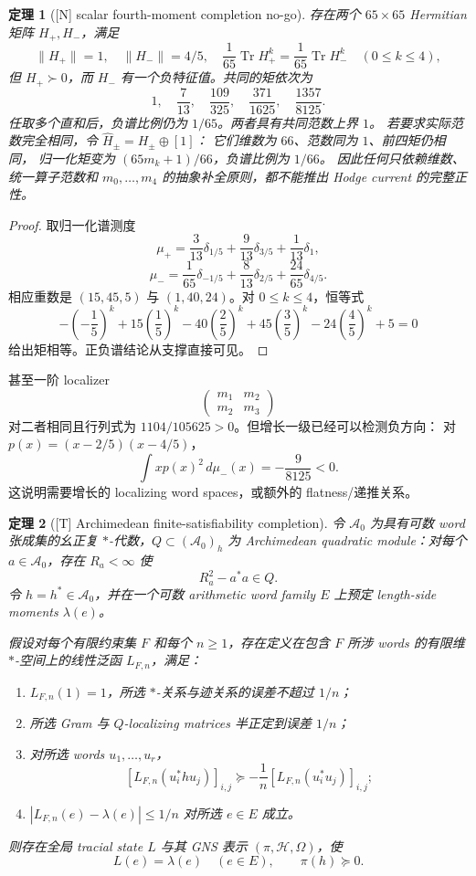 \documentclass[UTF8,11pt,a4paper]{ctexart}
\newtheorem{theorem}{定理}[section]
\theoremstyle{definition}
\theoremstyle{remark}
\newcommand{\Tr}{\operatorname{Tr}}
\newcommand{\1}{\mathbf 1}
\newcommand{\cH}{\mathcal H}
\newcommand{\cA}{\mathcal A}
\newcommand{\statusT}{\textnormal{[T]}}
\newcommand{\statusN}{\textnormal{[N]}}
\begin{document}
\begin{theorem}[\statusN{} scalar fourth-moment completion no-go]
\label{thm:four-moment-nogo}
存在两个 $65\times65$ Hermitian 矩阵 $H_+,H_-$，满足
\[
 \|H_+\|=1,\quad\|H_-\|=4/5,\quad
 \frac1{65}\Tr H_+^k=\frac1{65}\Tr H_-^k
 \quad(0\le k\le4),
\]
但 $H_+\succ0$，而 $H_-$ 有一个负特征值。共同的矩依次为
\[
 1,\quad \frac7{13},\quad \frac{109}{325},\quad
 \frac{371}{1625},\quad \frac{1357}{8125}.
\]
任取多个直和后，负谱比例仍为 $1/65$。两者具有共同范数上界 $1$。
若要求实际范数完全相同，令 $\widehat H_\pm=H_\pm\oplus[1]$：
它们维数为 $66$、范数同为 $1$、前四矩仍相同，
归一化矩变为 $(65m_k+1)/66$，负谱比例为 $1/66$。
因此任何只依赖维数、统一算子范数和
$m_0,\ldots,m_4$ 的抽象补全原则，都不能推出 Hodge current 的完整正性。
\end{theorem}

\begin{proof}
取归一化谱测度
\[
 \mu_+=\frac3{13}\delta_{1/5}
 +\frac9{13}\delta_{3/5}+\frac1{13}\delta_1,
\]
\[
 \mu_-=\frac1{65}\delta_{-1/5}
 +\frac8{13}\delta_{2/5}+\frac{24}{65}\delta_{4/5}.
\]
相应重数是 $(15,45,5)$ 与 $(1,40,24)$。对 $0\le k\le4$，恒等式
\[
 -\left(-\frac15\right)^k+15\left(\frac15\right)^k
 -40\left(\frac25\right)^k+45\left(\frac35\right)^k
 -24\left(\frac45\right)^k+5=0
\]
给出矩相等。正负谱结论从支撑直接可见。
\end{proof}

甚至一阶 localizer
\[
 \begin{pmatrix}m_1&m_2\\m_2&m_3\end{pmatrix}
\]
对二者相同且行列式为 $1104/105625>0$。但增长一级已经可以检测负方向：
对 $p(x)=(x-2/5)(x-4/5)$，
\[
 \int xp(x)^2\,d\mu_-(x)=-\frac9{8125}<0.
\]
这说明需要增长的 localizing word spaces，或额外的 flatness/递推关系。

\begin{theorem}[\statusT{} Archimedean finite-satisfiability completion]
\label{thm:localizer-completion}
令 $\cA_0$ 为具有可数 word 张成集的幺正复 $*$-代数，$Q\subset(\cA_0)_h$ 为
Archimedean quadratic module：对每个 $a\in\cA_0$，存在 $R_a<\infty$ 使
\[
 R_a^2-a^*a\in Q.
\]
令 $h=h^*\in\cA_0$，并在一个可数 arithmetic word family $E$ 上预定
length-side moments $\lambda(e)$。

假设对每个有限约束集 $F$ 和每个 $n\ge1$，存在定义在包含 $F$ 所涉 words
的有限维 $*$-空间上的线性泛函 $L_{F,n}$，满足：
\begin{enumerate}
 \item $L_{F,n}(1)=1$，所选 $*$-关系与迹关系的误差不超过 $1/n$；
 \item 所选 Gram 与 $Q$-localizing matrices 半正定到误差 $1/n$；
 \item 对所选 words $u_1,\ldots,u_r$，
 \[
 [L_{F,n}(u_i^*hu_j)]_{i,j}
 \succeq-\frac1n[L_{F,n}(u_i^*u_j)]_{i,j};
 \]
 \item $|L_{F,n}(e)-\lambda(e)|\le1/n$ 对所选 $e\in E$ 成立。
\end{enumerate}
则存在全局 tracial state $L$ 与其 GNS 表示 $(\pi,\cH,\Omega)$，使
\[
 L(e)=\lambda(e)\quad(e\in E),\qquad \pi(h)\succeq0.
\]
\end{theorem}
\end{document}
